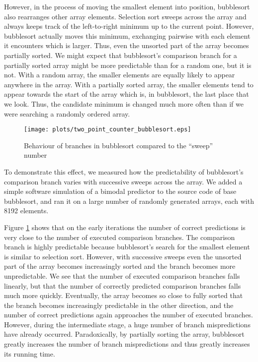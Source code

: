\documentclass[acmtocl]{acmtrans2m}
\begin{document}
However, in the process of moving the smallest element into position,
bubblesort also rearranges other array elements. Selection sort sweeps
across the array and always keeps track of the left-to-right minimum
up to the current point.  However, bubblesort actually moves this
minimum, exchanging pairwise with each element it encounters which is
larger. Thus, even the unsorted part of the array becomes partially
sorted. We might expect that bubblesort's comparison branch for a
partially sorted array might be more predictable than for a random
one, but it is not. With a random array, the smaller elements are
equally likely to appear anywhere in the array. With a partially
sorted array, the smaller elements tend to appear towards the start of
the array which is, in bubblesort, the last place that we look. Thus,
the candidate minimum is changed much more often than if we were
searching a randomly ordered array.

\begin{figure}
\texttt{[image: plots/two\_point\_counter\_bubblesort.eps]}
\caption{Behaviour of branches in bubblesort compared to the ``sweep'' number}
\label{Predictability-of-branches-in-bubblesort-compared-to-sweep-number}
\end{figure}

To demonstrate this effect, we measured how the predictability of
bubblesort's comparison branch varies with successive sweeps across
the array. We added a simple software simulation of a bimodal
predictor to the source code of base bubblesort, and ran it on a large
number of randomly generated arrays, each with 8192 elements.

Figure
\ref{Predictability-of-branches-in-bubblesort-compared-to-sweep-number}
shows that on the early iterations the number of correct predictions
is very close to the number of executed comparison branches. The
comparison branch is highly predictable because bubblesort's search
for the smallest element is similar to selection sort. However, with
successive sweeps even the unsorted part of the array becomes
increasingly sorted and the branch becomes more unpredictable. We see
that the number of executed comparison branches falls linearly, but
that the number of correctly predicted comparison branches falls much
more quickly. Eventually, the array becomes so close to fully sorted
that the branch becomes increasingly predictable in the other
direction, and the number of correct predictions again approaches the
number of executed branches. However, during the intermediate stage,
a huge number of branch mispredictions have already
occurred. Paradoxically, by partially sorting the array, bubblesort
greatly increases the number of branch mispredictions and thus greatly
increases its running time.
\end{document}
